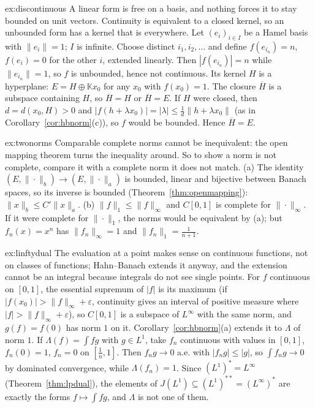 \begin{solution}{ex:discontinuous}
\idea A linear form is free on a basis, and nothing forces it to stay bounded on unit vectors. Continuity is equivalent to a closed kernel, so an unbounded form has a kernel that is everywhere.
\writeup Let $(e_i)_{i\in I}$ be a Hamel basis with $\|e_i\|=1$; $I$ is infinite. Choose distinct $i_1,i_2,\dots$ and define $f(e_{i_n})=n$, $f(e_i)=0$ for the other $i$, extended linearly. Then $|f(e_{i_n})|=n$ while
$\|e_{i_n}\|=1$, so $f$ is unbounded, hence not continuous. Its kernel $H$ is a hyperplane: $E=H\oplus\mathbb Kx_0$ for any $x_0$ with $f(x_0)=1$. The closure $\overline H$ is a subspace containing $H$, so $\overline H=H$
or $\overline H=E$. If $H$ were closed, then $d=d(x_0,H)>0$ and $|f(h+\lambda x_0)|=|\lambda|\le\frac1d\|h+\lambda x_0\|$ (as in Corollary~\ref{cor:hbnorm}(c)), so $f$ would be bounded. Hence $\overline H=E$.
\end{solution}

\begin{solution}{ex:twonorms}
\idea Comparable complete norms cannot be inequivalent: the open mapping theorem turns the inequality around. So to show a norm is not complete, compare it with a complete norm it does not match.
\writeup (a) The identity $(E,\|\cdot\|_b)\to(E,\|\cdot\|_a)$ is bounded, linear and bijective between Banach spaces, so its inverse is bounded (Theorem~\ref{thm:openmapping}): $\|x\|_b\le C'\|x\|_a$. (b) $\|f\|_1\le\|f\|_\infty$ and
$C[0,1]$ is complete for $\|\cdot\|_\infty$. If it were complete for $\|\cdot\|_1$, the norms would be equivalent by (a); but $f_n(x)=x^n$ has $\|f_n\|_\infty=1$ and $\|f_n\|_1=\frac1{n+1}$.
\end{solution}

\begin{solution}{ex:linftydual}
\idea The evaluation at a point makes sense on continuous functions, not on classes of functions; Hahn--Banach extends it anyway, and the extension cannot be an integral because integrals do not see single points.
\writeup For $f$ continuous on $[0,1]$, the essential supremum of $|f|$ is its maximum (if $|f(x_0)|>\|f\|_\infty+\varepsilon$, continuity gives an interval of positive measure where $|f|>\|f\|_\infty+\varepsilon$), so $C[0,1]$ is a
subspace of $L^\infty$ with the same norm, and $g(f)=f(0)$ has norm $1$ on it. Corollary~\ref{cor:hbnorm}(a) extends it to $\Lambda$ of norm $1$. If $\Lambda(f)=\int fg$ with $g\in L^1$, take $f_n$ continuous with values in
$[0,1]$, $f_n(0)=1$, $f_n=0$ on $[\frac1n,1]$. Then $f_ng\to0$ a.e. with $|f_ng|\le|g|$, so $\int f_ng\to0$ by dominated convergence, while $\Lambda(f_n)=1$. Since $(L^1)^*=L^\infty$ (Theorem~\ref{thm:lpdual}), the elements of $J(L^1)\subseteq(L^1)^{**}=(L^\infty)^*$ are exactly the forms $f\mapsto\int fg$, and $\Lambda$ is not one of
them.
\end{solution}

